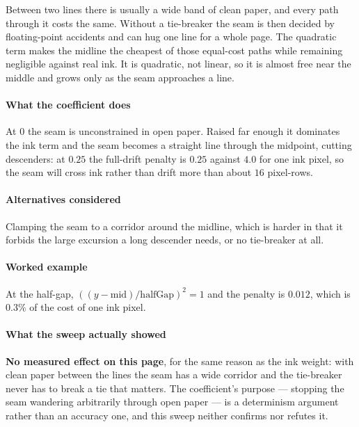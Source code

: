 Between two lines there is usually a wide band of clean paper, and every path through it costs the same. Without a tie-breaker the seam is then decided by floating-point accidents and can hug one line for a whole page. The quadratic term makes the midline the cheapest of those equal-cost paths while remaining negligible against real ink. It is quadratic, not linear, so it is almost free near the middle and grows only as the seam approaches a line.

\paragraph{What the coefficient does}

At $0$ the seam is unconstrained in open paper. Raised far enough it dominates the ink term and the seam becomes a straight line through the midpoint, cutting descenders: at $0.25$ the full-drift penalty is $0.25$ against $4.0$ for one ink pixel, so the seam will cross ink rather than drift more than about $16$ pixel-rows.

\paragraph{Alternatives considered}

Clamping the seam to a corridor around the midline, which is harder in that it forbids the large excursion a long descender needs, or no tie-breaker at all.

\paragraph{Worked example}

At the half-gap, $((y-\text{mid})/\text{halfGap})^2 = 1$ and the penalty is $0.012$, which is $0.3\%$ of the cost of one ink pixel.

\paragraph{What the sweep actually showed}

\textbf{No measured effect on this page}, for the same reason as the ink weight: with clean paper between the lines the seam has a wide corridor and the tie-breaker never has to break a tie that matters. The coefficient's purpose --- stopping the seam wandering arbitrarily through open paper --- is a determinism argument rather than an accuracy one, and this sweep neither confirms nor refutes it.

